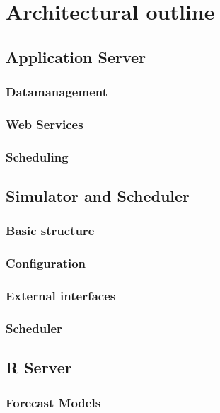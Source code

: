

\section{Architectural outline}

\subsection{Application Server}

\subsubsection{Datamanagement}

\subsubsection{Web Services}

\subsubsection{Scheduling}


\subsection{Simulator and Scheduler}

\subsubsection{Basic structure}

\subsubsection{Configuration}

\subsubsection{External interfaces}

\subsubsection{Scheduler}


\subsection{R Server}

\subsubsection{Forecast Models}

